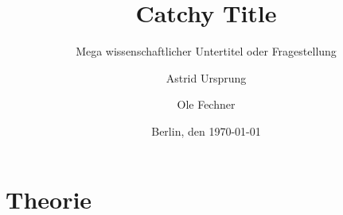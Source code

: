 \documentclass[12pt, titlepage=true, toc=bib]{scrartcl}
\begin{document}
\titlehead{Freie Universität Berlin\\
			FB Politik- und Sozialwissenschaften\\
			Otto-Suhr-Institut\\
			Sommersemester 2016\\
			{[}GEND{]} Rechtsextremismus und Gender: Geschichte und Gegenwart (15095)\\
			Carmen Altmeyer, Till Herold}
\author{Astrid Ursprung\and Ole Fechner}
\title{Catchy Title}
\subtitle{Mega wissenschaftlicher Untertitel oder Fragestellung}
\date{\normalsize{Berlin, den \today}}

\publishers{\normalsize{Goltzstr. 16\hfill Gerichtstr. 13\\
							 10781 Berlin\hfill 13347 Berlin\\
							 ursprung@posteo.de\hfill ole.fechner@fu-berlin.de\\
							 Matrikelnummer: 4768210\hfill Matrikelnummer: 4757766\\
							 BA Politikwissenschaft\hfill BA Politikwissenschaft}}


\maketitle[0]

\newpage
\thispagestyle{empty}
\tableofcontents

\newpage
\setcounter{page}{1}

\section{Theorie}
\end{document}
